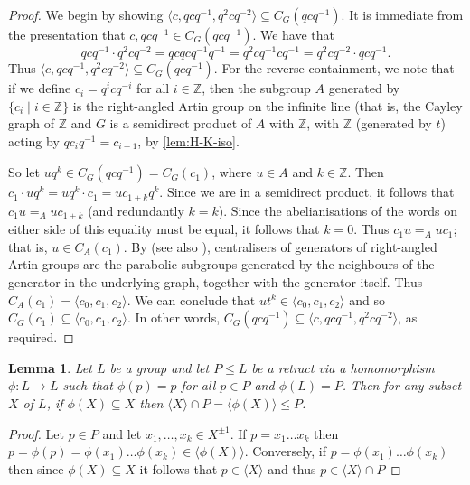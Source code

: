 \documentclass[11pt]{amsart}
\newtheorem{lem}[theorem]{Lemma}
\theoremstyle{definition}
\numberwithin{theorem}{section}
\newcommand{\Z}{\mathbb{Z}}
\begin{document}
\begin{proof}
		We begin by showing \(\langle c, qcq^{-1}, q^2 c q^{-2} \rangle \subseteq C_G(qcq^{-1})\).
		It is immediate from the presentation that \(c, qcq^{-1} \in C_G(qcq^{-1})\). We have
		that 
		\[
			qcq^{-1} \cdot q^2 c q^{-2} = qc qc q^{-1} q^{-1} = q^2cq^{-1} cq^{-1} = 
			q^2 c q^{-2} \cdot qcq^{-1}.
		\]
		Thus \(\langle c, qcq^{-1}, q^2 c q^{-2} \rangle \subseteq
		C_G(qcq^{-1})\). For the reverse containment, we note that if we define
		\(c_i = q^i c q^{-i}\) for all \(i \in \Z\), then the subgroup \(A\)
		generated by \(\{c_i \mid i \in \Z\}\) is the right-angled Artin group
		on the infinite line (that is, the Cayley graph of \(\Z\) and
		\(G\) is a semidirect product of \(A\) with \(\Z\), with \(\Z\)
		(generated by \(t\)) acting by \(q c_i q^{-1} = c_{i + 1}\), by
		\cref{lem:H-K-iso}.

		So let \(u q^k \in C_G(qcq^{-1}) = C_G(c_1)\), where \(u \in A\) and
		\(k \in \Z\). Then
			\(c_1 \cdot uq^k  = uq^k \cdot c_1 
						    = u c_{1 + k} q^k\).
		Since we are in a semidirect product, it follows that \(c_1 u =_A u
		c_{1 + k}\) (and redundantly \(k = k\)). Since the abelianisations of
		the words on either side of this equality must be equal, it follows
		that \(k = 0\). Thus \(c_1 u =_A u c_1\); that is, \(u \in C_A(c_1)\).
		By \cite[The Centralizer Theorem]{Servatius89} (see also
		\cite[Proposition 2.1]{DayWade19}), centralisers of generators of
		right-angled Artin groups are the parabolic subgroups generated by the
		neighbours of the generator in the underlying graph, together with the
		generator itself. Thus \(C_A(c_1) = \langle c_0, c_1, c_2 \rangle\).
		We can conclude that \(ut^k \in \langle c_0, c_1, c_2 \rangle\) and so
		\(C_G(c_1) \subseteq \langle c_0, c_1, c_2\rangle\). In other words,
		\(C_G(qcq^{-1}) \subseteq \langle c, qcq^{-1}, q^2 cq^{-2} \rangle\),
		as required.
\end{proof}

\begin{lem}\label{lem:retraction}
Let $L$ be a group and let $P \leq L$ be a retract via a homomorphism $\phi: L \rightarrow L$ such that $\phi(p) = p$ for all $p \in P$ and $\phi(L) = P$. Then for any subset $X$ of $L$, if $\phi(X) \subseteq X$ then $\langle X \rangle \cap P = \langle \phi(X) \rangle \leq P$. 
  \end{lem}
\begin{proof} 
Let $p \in P$ and let $x_1, \ldots, x_k \in X^{\pm 1}$.
If  
$p = x_1 \ldots x_k$ then $p = \phi(p) = \phi(x_1) \ldots \phi(x_k) \in \langle \phi(X) \rangle$. Conversely, if $p = \phi(x_1) \ldots \phi(x_k)$ then since $\phi(X) \subseteq X$ it follows that $p \in \langle X \rangle$ and thus $p \in \langle X \rangle \cap P$        
  \end{proof}
\end{document}
